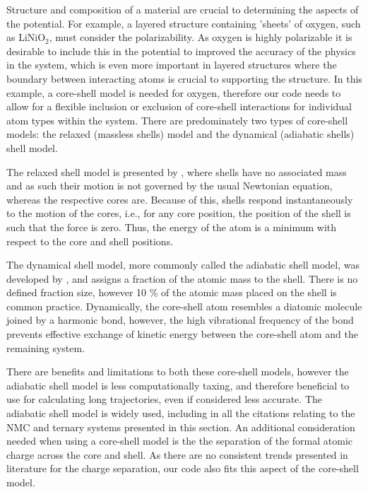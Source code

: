 \documentclass[journal=jacsat,manuscript=article]{achemso}
\begin{document}
Structure and composition of a material are crucial to determining the aspects of the potential. For example, a layered structure containing 'sheets' of oxygen, such as LiNiO$_2$, must consider the polarizability. As oxygen is highly polarizable it is desirable to include this in the potential to improved the accuracy of the physics in the system, which is even more important in layered structures where the boundary between interacting atoms is crucial to supporting the structure. In this example, a core-shell model is needed for oxygen, therefore our code needs to allow for a flexible inclusion or exclusion of core-shell interactions for individual atom types within the system. There are predominately two types of core-shell models: the relaxed (massless shells) model and the dynamical (adiabatic shells) shell model.

The relaxed shell model is presented by \citeauthor{Lindan_1993}, \cite{Lindan_1993} where shells have no associated mass and as such their motion is not governed by the usual Newtonian equation, whereas the respective cores are. Because of this, shells respond instantaneously to the motion of the cores, i.e., for any core position, the position of the shell is such that the force is zero. Thus, the energy of the atom is a minimum with respect to the core and shell positions.

The dynamical shell model, more commonly called the adiabatic shell model, was developed by \citeauthor{Mitchell_1993}, \cite{Mitchell_1993} and assigns a fraction of the atomic mass to the shell. There is no defined fraction size, however 10 \% of the atomic mass placed on the shell is common practice. Dynamically, the core-shell atom resembles a diatomic molecule joined by a harmonic bond, however, the high vibrational frequency of the bond prevents effective exchange of kinetic energy between the core-shell atom and the remaining system.

There are benefits and limitations to both these core-shell models, however the adiabatic shell model is less computationally taxing, and therefore beneficial to use for calculating long trajectories, even if considered less accurate. The adiabatic shell model is widely used, including in all the citations relating to the NMC and ternary systems presented in this section. An additional consideration needed when using a core-shell model is the the separation of the formal atomic charge across the core and shell. As there are no consistent trends presented in literature for the charge separation, our code also fits this aspect of the core-shell model.
\end{document}
